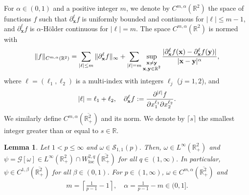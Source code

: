 \documentclass[11pt]{amsart}
\newtheorem{lemma}[theorem]{Lemma}
\theoremstyle{definition}
\theoremstyle{definition}
\numberwithin{equation}{section}
\newcommand{\0}{\emptyset}
\newcommand{\bfx}{{\bf x}}
\newcommand{\bbR}{\mathbb R}
\newcommand{\calG}{\mathcal G}
\newcommand{\calS}{\mathcal S}
\begin{document}
			For $\alpha \in (0,1)$ and a positive integer $m$, we denote by $C^{m,\alpha}(\mathbb{R}^2)$ the space of functions $f$ such that $\partial^\ell_{\mathbf{x}} f$ is uniformly bounded and continuous for $|\ell| \leq m-1$, and $\partial^\ell_{\mathbf{x}} f$ is $\alpha$-H\"older continuous for $|\ell| = m$. The space $C^{m,\alpha}(\mathbb{R}^2)$ is normed with  
			\[
			\|f\|_{C^{m, \alpha}(\mathbb{R}^2)} =  \sum_{|\ell| \leq m} \|\partial_{\mathbf{x}}^\ell f\|_{\infty} + \sum_{|\ell| = m} \sup_{\substack{\mathbf{x} \neq \mathbf{y} \\ \mathbf{x}, \mathbf{y} \in \mathbb{R}^2}} \frac{|\partial_{\bfx}^\ell f(\mathbf{x}) - \partial_{\bfx}^\ell f(\mathbf{y})|}{|\mathbf{x} - \mathbf{y}|^{\alpha}},
			\]  
			where $\ell = (\ell_1, \ell_2)$ is a multi-index with integers $\ell_j$ ($j=1,2$), and  
			\[
			|\ell| = \ell_1 + \ell_2, \quad \partial_{\bfx}^\ell f := \frac{\partial^{|\ell|} f}{\partial x_1^{\ell_1} \partial x_2^{\ell_2}}.
			\]
			We similarly define $C^{m, \alpha}(\overline{\mathbb{R}^2_+})$ and its norm. We denote by $\lceil s \rceil$ the smallest integer greater than or equal to $s \in \bbR$.
			
			\begin{lemma}\label{lem_regularity_1}
				Let $1<p \leq \infty$ and $\omega \in \calS_{1,1}(p)$. Then, $\omega\in L^{\infty}(\bbR^2_+)$ and $\psi =\calG[\omega] \in L^{\infty}(\mathbb{R}^{2}_{+})\cap W^{2,q}_{\mathrm{loc}}(\overline{\mathbb{R}_{+}^{2}})$ for all $q\in (1,\infty)$. In particular, $\psi\in C^{1,\beta}(\overline{\mathbb{R}^{2}_{+}})$ for all $\beta \in (0, 1)$. For $p\in(1,\infty)$, $\omega\in C^{m, \alpha}(\overline{\bbR^2_{+}})$ and 
				\begin{align}
					m = \left\lceil \frac{1}{p-1} - 1 \right\rceil, \quad
					\alpha = \frac{1}{p-1} - m \in (0,1]. \label{malpha}
				\end{align}
			\end{lemma}
			
			
			
			
			
\end{document}
